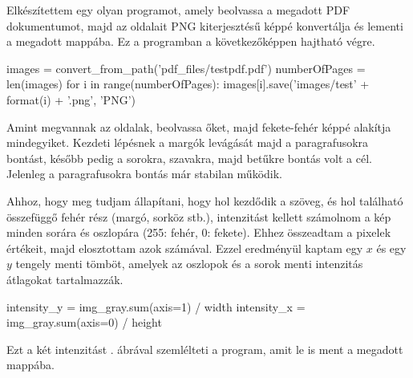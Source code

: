 
Elkészítettem egy olyan programot, amely beolvassa a megadott PDF dokumentumot, majd az oldalait PNG kiterjesztésű képpé konvertálja és lementi a megadott mappába.
Ez a programban a következőképpen hajtható végre.

\begin{python}
images = convert_from_path('pdf_files/testpdf.pdf')
numberOfPages = len(images)
for i in range(numberOfPages):
    images[i].save('images/test' + format(i) + '.png', 'PNG')
\end{python}

Amint megvannak az oldalak, beolvassa őket, majd fekete-fehér képpé alakítja mindegyiket. Kezdeti lépésnek a margók levágását majd a paragrafusokra bontást, később pedig a sorokra, szavakra, majd betűkre bontás volt a cél. Jelenleg a paragrafusokra bontás már stabilan működik.

Ahhoz, hogy meg tudjam állapítani, hogy hol kezdődik a szöveg, és hol található összefüggő fehér rész (margó, sorköz stb.), intenzitást kellett számolnom a kép minden sorára és oszlopára (255: fehér, 0: fekete). Ehhez összeadtam a pixelek értékeit, majd elosztottam azok számával. Ezzel eredményül kaptam egy $x$ és egy $y$ tengely menti tömböt, amelyek az oszlopok és a sorok menti intenzitás átlagokat tartalmazzák.

\begin{python}
intensity_y = img_gray.sum(axis=1) / width
intensity_x = img_gray.sum(axis=0) / height
\end{python}

Ezt a két intenzitást . ábrával szemlélteti a program, amit le is ment a megadott mappába.

